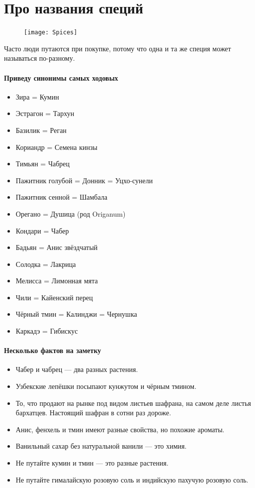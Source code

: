 \section{Про названия специй}

\begin{figure}[ht]
    \centering
    \texttt{[image: Spices]}
\end{figure} 
Часто люди путаются при покупке, потому что одна и та же специя может называться по-разному. \paragraph{Приведу синонимы самых ходовых}
\begin{itemize}

\item Зира = Кумин
\item Эстрагон = Тархун
\item Базилик = Реган
\item Кориандр = Семена кинзы
\item Тимьян = Чабрец
\item Пажитник голубой = Донник = Уцхо-сунели
\item Пажитник сенной = Шамбала
\item Орегано = Душица (род Origanum)
\item Кондари = Чабер
\item Бадьян = Анис звёздчатый
\item Солодка = Лакрица
\item Мелисса = Лимонная мята
\item Чили = Кайенский перец
\item Чёрный тмин = Калинджи = Чернушка
\item Каркадэ = Гибискус

\end{itemize}
\paragraph{Несколько фактов на заметку}
\begin{itemize}
\item  Чабер и чабрец — два разных растения.
\item  Узбекские лепёшки посыпают кунжутом и чёрным тмином.
\item То, что продают на рынке под видом листьев шафрана, на самом деле листья бархатцев. Настоящий шафран в сотни раз дороже.
\item Анис, фенхель и тмин имеют разные свойства, но похожие ароматы.
\item Ванильный сахар без натуральной ванили — это химия.
\item Не путайте кумин и тмин — это разные растения.
\item Не путайте гималайскую розовую соль и индийскую пахучую розовую соль.
\end{itemize}

